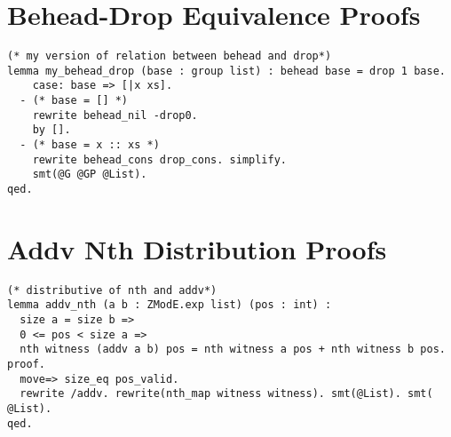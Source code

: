\section{Behead-Drop Equivalence Proofs}
\label{sec:behead-drop-proofs}

\begin{lstlisting}[style=easycrypt, caption=Proof of Behead-Drop Equivalence, breaklines=true, breakatwhitespace=true, frame=single, keepspaces=true]
(* my version of relation between behead and drop*)
lemma my_behead_drop (base : group list) : behead base = drop 1 base.
    case: base => [|x xs].
  - (* base = [] *)
    rewrite behead_nil -drop0.
    by [].
  - (* base = x :: xs *)
    rewrite behead_cons drop_cons. simplify.
    smt(@G @GP @List).
qed.
\end{lstlisting}

\section{Addv Nth Distribution Proofs}
\label{sec:addv-nth-proofs}

\begin{lstlisting}[style=easycrypt, caption=Proof of Addv Nth Distribution, breaklines=true, breakatwhitespace=true, frame=single, keepspaces=true]
(* distributive of nth and addv*)
lemma addv_nth (a b : ZModE.exp list) (pos : int) :
  size a = size b =>
  0 <= pos < size a =>
  nth witness (addv a b) pos = nth witness a pos + nth witness b pos.
proof.
  move=> size_eq pos_valid.
  rewrite /addv. rewrite(nth_map witness witness). smt(@List). smt( @List).
qed.
\end{lstlisting}







